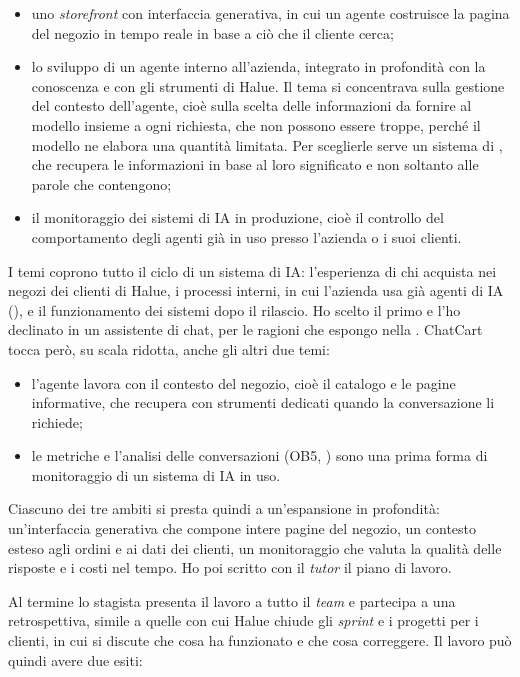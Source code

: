 \begin{itemize}
	\item uno \emph{storefront} con interfaccia generativa, in cui un agente costruisce la pagina del
	negozio in tempo reale in base a ciò che il cliente cerca;
	\item lo sviluppo di un agente interno all’azienda, integrato in profondità con la conoscenza e
	con gli strumenti di Halue. Il tema si concentrava sulla gestione del contesto dell’agente, cioè
	sulla scelta delle informazioni da fornire al modello insieme a ogni richiesta, che non possono
	essere troppe, perché il modello ne elabora una quantità limitata. Per sceglierle serve un sistema
	di , che recupera le informazioni in base al loro
	significato e non soltanto alle parole che contengono;
	\item il monitoraggio dei sistemi di IA in produzione, cioè il controllo del comportamento degli
	agenti già in uso presso l’azienda o i suoi clienti.
\end{itemize}

I temi coprono tutto il ciclo di un sistema di IA: l’esperienza di chi acquista nei negozi dei
clienti di Halue, i processi interni, in cui l’azienda usa già agenti di IA
(), e il funzionamento dei sistemi dopo il rilascio. Ho scelto il primo e
l’ho declinato in un assistente di chat, per le ragioni che espongo nella
. ChatCart tocca però, su scala ridotta, anche gli altri due temi:

\begin{itemize}
	\item l’agente lavora con il contesto del negozio, cioè il catalogo e le pagine informative, che
	recupera con strumenti dedicati quando la conversazione li richiede;
	\item le metriche e l’analisi delle conversazioni (OB5, ) sono una prima forma di
	monitoraggio di un sistema di IA in uso.
\end{itemize}

Ciascuno dei tre ambiti si presta quindi a un’espansione in profondità: un’interfaccia generativa
che compone intere pagine del negozio, un contesto esteso agli ordini e ai dati dei clienti, un
monitoraggio che valuta la qualità delle risposte e i costi nel tempo. Ho poi scritto con il
\emph{tutor} il piano di lavoro.

Al termine lo stagista presenta il lavoro a tutto il \emph{team} e partecipa a una retrospettiva,
simile a quelle con cui Halue chiude gli \emph{sprint} e i progetti per i clienti, in cui si discute
che cosa ha funzionato e che cosa correggere. Il lavoro può
quindi avere due esiti:

